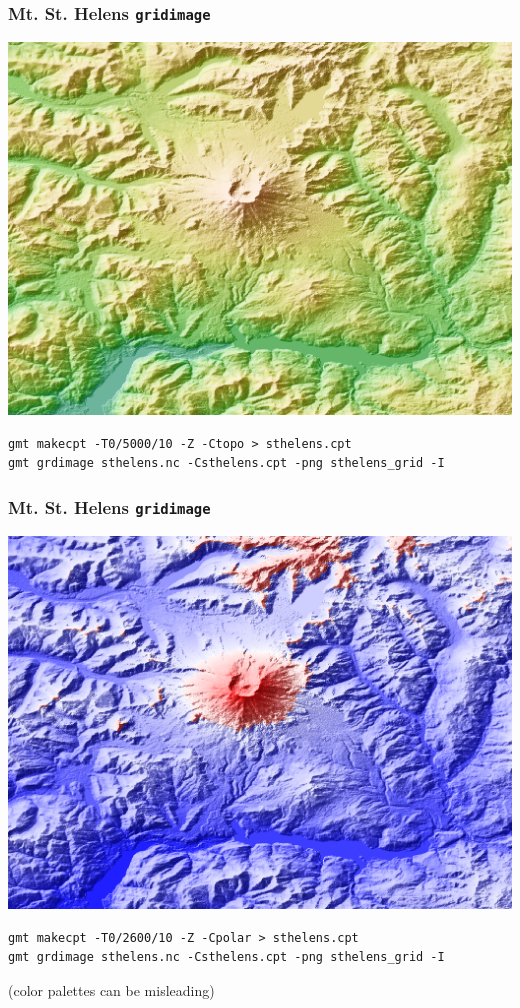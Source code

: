 \documentclass[unknownkeysallowed]{beamer}
\begin{document}
\begin{frame}[fragile=singleslide]
\frametitle{Mt. St. Helens {\tt gridimage}}
		\begin{center}
			\includegraphics[width=.7\textwidth]{../figures/gmt_sthelens_grid.png}	
		\end{center}
{\scriptsize
	\begin{verbatim}
gmt makecpt -T0/5000/10 -Z -Ctopo > sthelens.cpt
gmt grdimage sthelens.nc -Csthelens.cpt -png sthelens_grid -I
	\end{verbatim}
}
\end{frame}

\begin{frame}[fragile=singleslide]
\frametitle{Mt. St. Helens {\tt gridimage}}
		\begin{center}
			\includegraphics[width=.7\textwidth]{../figures/gmt_sthelens_grid_polar.png}	
		\end{center}
{\scriptsize
	\begin{verbatim}
gmt makecpt -T0/2600/10 -Z -Cpolar > sthelens.cpt
gmt grdimage sthelens.nc -Csthelens.cpt -png sthelens_grid -I
	\end{verbatim}
}
(color palettes can be misleading)
\end{frame}
\end{document}
